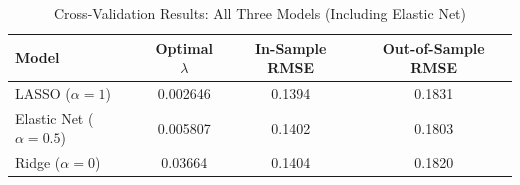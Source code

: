 \begin{table}[H]
\centering
\caption{Cross-Validation Results: All Three Models (Including Elastic Net)}
\label{tab:enet_results}
\begin{tabular}{lccc}
\hline\hline
Model & Optimal $\lambda$ & In-Sample RMSE & Out-of-Sample RMSE \\
\hline
LASSO ($\alpha = 1$)        & 0.002646 & 0.1394 & 0.1831 \\
Elastic Net ($\alpha = 0.5$) & 0.005807 & 0.1402 & 0.1803 \\
Ridge ($\alpha = 0$)        & 0.03664  & 0.1404 & 0.1820 \\
\hline\hline
\end{tabular}
\end{table}
